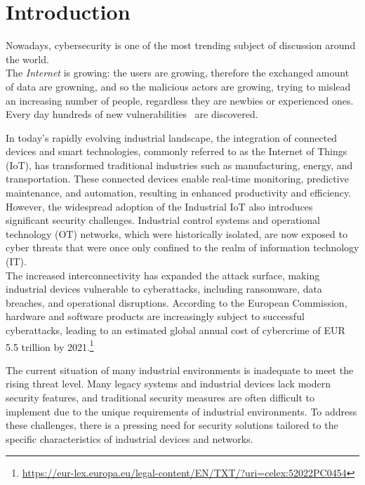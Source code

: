 \chapter{Introduction}
\label{cha:intro}

Nowadays, cybersecurity is one of the most trending subject of discussion around the world.\\

The \textit{Internet} is growing: the users are growing, therefore the exchanged amount of data are growning, and so the malicious actors are growing, trying to mislead an increasing number of people, regardless they are newbies or experienced ones. Every day hundreds of new vulnerabilities~\cite{cve-details-db} are discovered.

In today's rapidly evolving industrial landscape, the integration of connected devices and smart technologies, commonly referred to as the Internet of Things (IoT), has transformed traditional industries such as manufacturing, energy, and transportation. These connected devices enable real-time monitoring, predictive maintenance, and automation, resulting in enhanced productivity and efficiency. \\
However, the widespread adoption of the Industrial IoT also introduces significant security challenges. Industrial control systems and operational technology (OT) networks, which were historically isolated, are now exposed to cyber threats that were once only confined to the realm of information technology (IT). \\
The increased interconnectivity has expanded the attack surface, making industrial devices vulnerable to cyberattacks, including ransomware, data breaches, and operational disruptions. According to the European Commission, hardware and software products are increasingly subject to successful cyberattacks, leading to an estimated global annual cost of cybercrime of EUR 5.5 trillion by 2021.\footnote{\url{https://eur-lex.europa.eu/legal-content/EN/TXT/?uri=celex:52022PC0454}}

The current situation of many industrial environments is inadequate to meet the rising threat level. Many legacy systems and industrial devices lack modern security features, and traditional security measures are often difficult to implement due to the unique requirements of industrial environments. To address these challenges, there is a pressing need for security solutions tailored to the specific characteristics of industrial devices and networks. 

